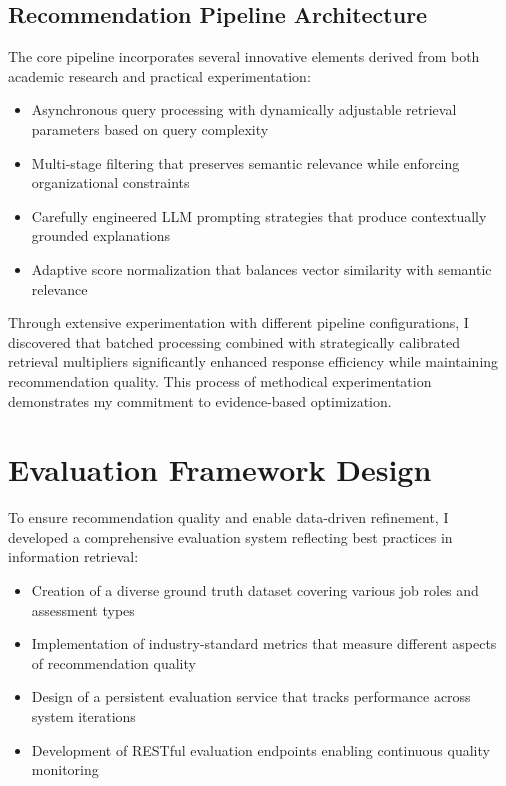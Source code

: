 \documentclass[10pt,a4paper,twocolumn]{article}
\begin{document}
\subsection{Recommendation Pipeline Architecture}
\small
The core pipeline incorporates several innovative elements derived from both academic research and practical experimentation:
\begin{itemize}[leftmargin=*,itemsep=2pt,topsep=0pt,parsep=0pt]
    \item Asynchronous query processing with dynamically adjustable retrieval parameters based on query complexity
    \item Multi-stage filtering that preserves semantic relevance while enforcing organizational constraints
    \item Carefully engineered LLM prompting strategies that produce contextually grounded explanations
    \item Adaptive score normalization that balances vector similarity with semantic relevance
\end{itemize}

Through extensive experimentation with different pipeline configurations, I discovered that batched processing combined with strategically calibrated retrieval multipliers significantly enhanced response efficiency while maintaining recommendation quality. This process of methodical experimentation demonstrates my commitment to evidence-based optimization.

\section{Evaluation Framework Design}
\small
To ensure recommendation quality and enable data-driven refinement, I developed a comprehensive evaluation system reflecting best practices in information retrieval:
\begin{itemize}[leftmargin=*,itemsep=2pt,topsep=0pt,parsep=0pt]
    \item Creation of a diverse ground truth dataset covering various job roles and assessment types
    \item Implementation of industry-standard metrics that measure different aspects of recommendation quality
    \item Design of a persistent evaluation service that tracks performance across system iterations
    \item Development of RESTful evaluation endpoints enabling continuous quality monitoring
\end{itemize}
\end{document}
